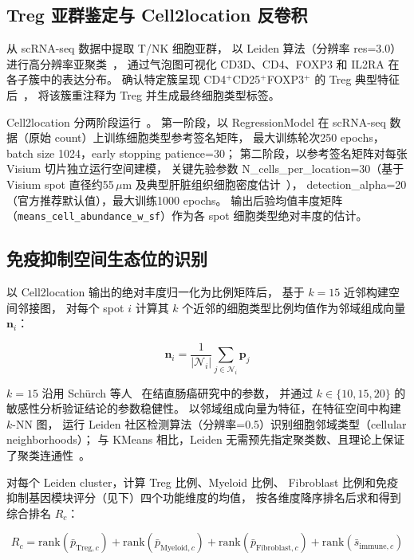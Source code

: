 \documentclass[12pt, a4paper]{ctexart}
\begin{document}
\subsection{Treg 亚群鉴定与 Cell2location 反卷积}

从 scRNA-seq 数据中提取 T/NK 细胞亚群，
以 Leiden 算法（分辨率 res=3.0）进行高分辨率亚聚类~\citep{traag2019leiden}，
通过气泡图可视化 CD3D、CD4、FOXP3 和 IL2RA 在各子簇中的表达分布。
确认特定簇呈现 CD4$^+$CD25$^+$FOXP3$^+$ 的 Treg 典型特征后~\citep{sakaguchi2020regulatory}，
将该簇重注释为 Treg 并生成最终细胞类型标签。

Cell2location 分两阶段运行~\citep{kleshchevnikov2022cell2location}。
第一阶段，以 RegressionModel 在 scRNA-seq 数据（原始 count）上训练细胞类型参考签名矩阵，
最大训练轮次250 epochs，batch size 1024，early stopping patience=30；
第二阶段，以参考签名矩阵对每张 Visium 切片独立运行空间建模，
关键先验参数 N\_cells\_per\_location=30（基于 Visium spot 直径约55\,$\mu$m 及典型肝脏组织细胞密度估计~\citep{kleshchevnikov2022cell2location}），
detection\_alpha=20（官方推荐默认值），最大训练1000 epochs。
输出后验均值丰度矩阵（\texttt{means\_cell\_abundance\_w\_sf}）作为各 spot 细胞类型绝对丰度的估计。

\subsection{免疫抑制空间生态位的识别}

以 Cell2location 输出的绝对丰度归一化为比例矩阵后，
基于 $k=15$ 近邻构建空间邻接图，
对每个 spot $i$ 计算其 $k$ 个近邻的细胞类型比例均值作为邻域组成向量 $\mathbf{n}_i$：

\begin{equation}
\mathbf{n}_i = \frac{1}{|\mathcal{N}_i|} \sum_{j \in \mathcal{N}_i} \mathbf{p}_j
\label{eq:neighborhood_vector}
\end{equation}

$k=15$ 沿用 Schürch 等人~\citep{schurch2020coordinated} 在结直肠癌研究中的参数，
并通过 $k \in \{10, 15, 20\}$ 的敏感性分析验证结论的参数稳健性。
以邻域组成向量为特征，在特征空间中构建 $k$-NN 图，
运行 Leiden 社区检测算法（分辨率=0.5）识别细胞邻域类型（cellular neighborhoods）；
与 KMeans 相比，Leiden 无需预先指定聚类数、且理论上保证了聚类连通性~\citep{traag2019leiden}。

对每个 Leiden cluster，计算 Treg 比例、Myeloid 比例、
Fibroblast 比例和免疫抑制基因模块评分（见下）四个功能维度的均值，
按各维度降序排名后求和得到综合排名 $R_c$：

\begin{equation}
R_c = \text{rank}(\bar{p}_{\text{Treg},c}) + \text{rank}(\bar{p}_{\text{Myeloid},c})
+ \text{rank}(\bar{p}_{\text{Fibroblast},c}) + \text{rank}(\bar{s}_{\text{immune},c})
\label{eq:combined_rank}
\end{equation}
\end{document}
